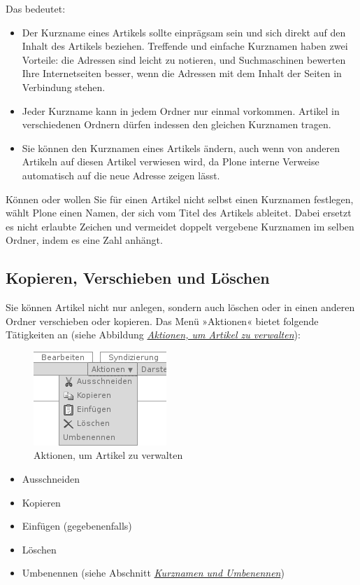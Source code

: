 \documentclass[a4paper,12pt,ngerman]{manual}
\begin{document}
Das bedeutet:
\begin{itemize}
\item {} 
Der Kurzname eines Artikels sollte einprägsam sein und sich direkt
auf den Inhalt des Artikels beziehen. Treffende und einfache
Kurznamen haben zwei Vorteile: die Adressen sind leicht zu notieren,
und Suchmaschinen bewerten Ihre Internetseiten besser, wenn die
Adressen mit dem Inhalt der Seiten in Verbindung stehen.

\item {} 
Jeder Kurzname kann in jedem Ordner nur einmal vorkommen. Artikel in
verschiedenen Ordnern dürfen indessen den gleichen Kurznamen tragen.

\item {} 
Sie können den Kurznamen eines Artikels ändern, auch wenn von anderen
Artikeln auf diesen Artikel verwiesen wird, da Plone interne Verweise
automatisch auf die neue Adresse zeigen lässt.

\end{itemize}

Können oder wollen Sie für einen Artikel nicht selbst einen Kurznamen
festlegen, wählt Plone einen Namen, der sich vom Titel des Artikels ableitet.
Dabei ersetzt es nicht erlaubte Zeichen und vermeidet doppelt vergebene
Kurznamen im selben Ordner, indem es eine Zahl anhängt.


\subsection{Kopieren, Verschieben und Löschen}

Sie können Artikel nicht nur anlegen, sondern auch löschen oder in einen
anderen Ordner verschieben oder kopieren. Das Menü
»Aktionen« bietet folgende Tätigkeiten an (siehe
Abbildung \hyperlink{fig-aktionen}{\emph{Aktionen, um Artikel zu verwalten}}):
\hypertarget{fig-aktionen}{}\begin{figure}[htbp]
\centering

\includegraphics{aktionen.png}
\caption{Aktionen, um Artikel zu verwalten}\end{figure}
\begin{itemize}
\item {} 
Ausschneiden

\item {} 
Kopieren

\item {} 
Einfügen (gegebenenfalls)

\item {} 
Löschen

\item {} 
Umbenennen (siehe Abschnitt \hyperlink{sec-kurzname}{\emph{Kurznamen und Umbenennen}})

\end{itemize}
\end{document}
